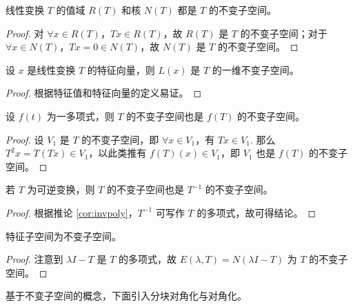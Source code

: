 \begin{theorem}
线性变换 $T$ 的值域 $R(T)$ 和核 $N(T)$ 都是 $T$ 的不变子空间。
\end{theorem}
\begin{proof}
对 $\forall x\in R(T)$，$Tx\in R(T)$，故 $R(T)$ 是 $T$ 的不变子空间；对于 $\forall x\in N(T)$，$Tx=0\in N(T)$，故 $N(T)$ 是 $T$ 的不变子空间。
\end{proof}

\begin{theorem}
设 $x$ 是线性变换 $T$ 的特征向量，则 $L(x)$ 是 $T$ 的一维不变子空间。
\end{theorem}
\begin{proof}
根据特征值和特征向量的定义易证。
\end{proof}

\begin{theorem}
设 $f(t)$ 为一多项式，则 $T$ 的不变子空间也是 $f(T)$ 的不变子空间。
\end{theorem}
\begin{proof}
设 $V_1$ 是 $T$ 的不变子空间，即 $\forall x\in V_1$，有 $Tx\in V_1$.  那么 $T^2x=T(Tx)\in V_1$，以此类推有 $f(T)(x)\in V_1$，即 $V_1$ 也是 $f(T)$ 的不变子空间。
\end{proof}

\begin{corollary}
若 $T$ 为可逆变换，则 $T$ 的不变子空间也是 $T^{-1}$ 的不变子空间。
\end{corollary}
\begin{proof}
根据推论 \ref{cor:invpoly}，$T^{-1}$ 可写作 $T$ 的多项式，故可得结论。
\end{proof}

\begin{corollary}
特征子空间为不变子空间。
\end{corollary}
\begin{proof}
注意到 $\lambda I-T$ 是 $T$ 的多项式，故 $E(\lambda,T)=N(\lambda I-T)$ 为 $T$ 的不变子空间。
\end{proof}

基于不变子空间的概念，下面引入分块对角化与对角化。

